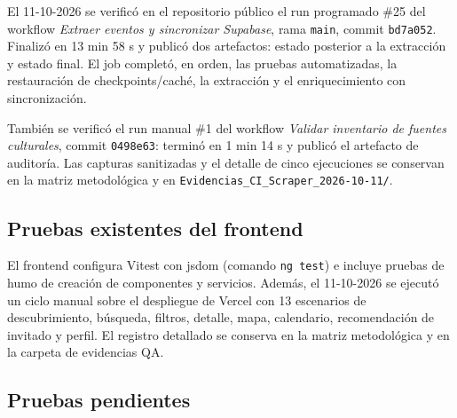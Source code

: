 El 11-10-2026 se verificó en el repositorio público el run programado \#25 del workflow
\emph{Extraer eventos y sincronizar Supabase}, rama \texttt{main}, commit
\texttt{bd7a052}. Finalizó en 13 min 58 s y publicó dos artefactos: estado posterior a
la extracción y estado final. El job completó, en orden, las pruebas automatizadas, la
restauración de checkpoints/caché, la extracción y el enriquecimiento con sincronización.

También se verificó el run manual \#1 del workflow \emph{Validar inventario de fuentes
culturales}, commit \texttt{0498e63}: terminó en 1 min 14 s y publicó el artefacto de
auditoría. Las capturas sanitizadas y el detalle de cinco ejecuciones se conservan en la
matriz metodológica y en \texttt{Evidencias\_CI\_Scraper\_2026-10-11/}.

\subsection{Pruebas existentes del frontend}

El frontend configura Vitest con jsdom (comando \texttt{ng test}) e incluye pruebas de
humo de creación de componentes y servicios. Además, el 11-10-2026 se ejecutó un ciclo
manual sobre el despliegue de Vercel con 13 escenarios de descubrimiento, búsqueda,
filtros, detalle, mapa, calendario, recomendación de invitado y perfil. El registro
detallado se conserva en la matriz metodológica y en la carpeta de evidencias QA.

\subsection{Pruebas pendientes}

